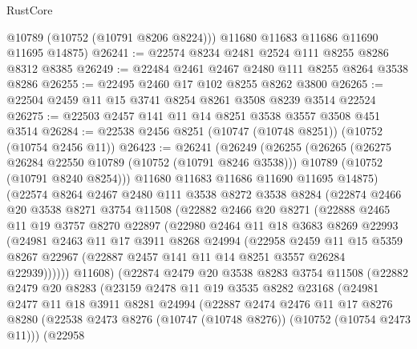 \begin{lexlean}{RustCore}
\begin{coremodule}
        @10789
        (@10752 (@10791 @8206 @8224)))
      @11680
      @11683
      @11686
      @11690
      @11695
      @14875)
@26241 := @22574 @8234 @2481 @2524 @111 @8255 @8286 @8312 @8385
@26249 := @22484 @2461 @2467 @2480 @111 @8255 @8264 @3538 @8286
@26255 := @22495 @2460 @17 @102 @8255 @8262 @3800
@26265 := @22504 @2459 @11 @15 @3741 @8254 @8261 @3508 @8239 @3514 @22524
@26275 := @22503 @2457 @141 @11 @14 @8251 @3538 @3557 @3508 @451 @3514
@26284 := @22538 @2456 @8251 (@10747 (@10748 @8251)) (@10752 (@10754 @2456 @11))
@26423 := @26241
    (@26249
      (@26255
        (@26265
          (@26275 @26284 @22550 @10789 (@10752 (@10791 @8246 @3538)))
          @10789
          (@10752 (@10791 @8240 @8254)))
        @11680
        @11683
        @11686
        @11690
        @11695
        @14875)
      (@22574
        @8264
        @2467
        @2480
        @111
        @3538
        @8272
        @3538
        @8284
        (@22874
          @2466
          @20
          @3538
          @8271
          @3754
          @11508
          (@22882
            @2466
            @20
            @8271
            (@22888
              @2465
              @11
              @19
              @3757
              @8270
              @22897
              (@22980
                @2464
                @11
                @18
                @3683
                @8269
                @22993
                (@24981
                  @2463
                  @11
                  @17
                  @3911
                  @8268
                  @24994
                  (@22958
                    @2459
                    @11
                    @15
                    @5359
                    @8267
                    @22967
                    (@22887 @2457 @141 @11 @14 @8251 @3557 @26284 @22939))))))
          @11608)
        (@22874
          @2479
          @20
          @3538
          @8283
          @3754
          @11508
          (@22882
            @2479
            @20
            @8283
            (@23159
              @2478
              @11
              @19
              @3535
              @8282
              @23168
              (@24981
                @2477
                @11
                @18
                @3911
                @8281
                @24994
                (@22887
                  @2474
                  @2476
                  @11
                  @17
                  @8276
                  @8280
                  (@22538 @2473 @8276 (@10747 (@10748 @8276)) (@10752 (@10754 @2473 @11)))
                  (@22958

\end{coremodule}
\end{lexlean}
